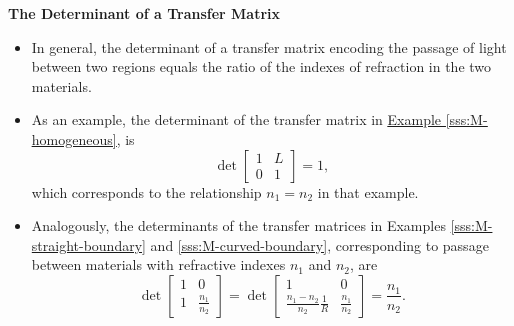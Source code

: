 \documentclass[11pt, a4paper]{article}
\begin{document}
\textbf{The Determinant of a Transfer Matrix}
\begin{itemize}

    \item In general, the determinant of a transfer matrix encoding the passage of light between two regions equals the ratio of the indexes of refraction in the two materials. 

    \item As an example, the determinant of the transfer matrix in \hyperref[sss:M-homogeneous]{\underline{Example \ref{sss:M-homogeneous}}}, is
    \begin{equation*}
        \det 
        \begin{bmatrix}
            1 & L\\
            0 & 1
        \end{bmatrix}
        = 1,
    \end{equation*}
    which corresponds to the relationship $ n_{1} = n_{2} $ in that example.

    \item Analogously, the determinants of the transfer matrices in Examples \ref{sss:M-straight-boundary} and \ref{sss:M-curved-boundary}, corresponding to passage between materials with refractive indexes $ n_{1} $ and $ n_{2} $, are
    \begin{equation*}
        \det
        \begin{bmatrix}
            1 & 0\\
            1 & \frac{n_{1}}{n_{2}}
        \end{bmatrix} = 
        \det 
        \begin{bmatrix}
            1 & 0\\
            \frac{n_{1} - n_{2}}{n_{2}} \frac{1}{R} & \frac{n_{1}}{n_{2}}
        \end{bmatrix}
        = \frac{n_{1}}{n_{2}}.
    \end{equation*}

\end{itemize}
\end{document}
